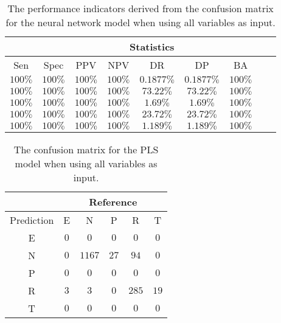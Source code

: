 \begin{table}[!ht]
	\centering
	\begin{tabular}{|c|c|c|c|c|c|c|c|c|}
		\hline
		 & \multicolumn{7}{c|}{Statistics} \\ \hline
		Sen & Spec & PPV & NPV & DR & DP & BA \\ \hline
		$100\%$ & $100\%$ & $100\%$ & $100\%$ & $0.1877\%$ & $0.1877\%$ & $100\%$ \\ \hline
		$100\%$ & $100\%$ & $100\%$ & $100\%$ & $73.22\%$ & $73.22\%$ & $100\%$ \\ \hline
		$100\%$ & $100\%$ & $100\%$ & $100\%$ & $1.69\%$ & $1.69\%$ & $100\%$ \\ \hline
		$100\%$ & $100\%$ & $100\%$ & $100\%$ & $23.72\%$ & $23.72\%$ & $100\%$ \\ \hline
		$100\%$ & $100\%$ & $100\%$ & $100\%$ & $1.189\%$ & $1.189\%$ & $100\%$ \\ \hline
	\end{tabular}
	\caption{The performance indicators derived from the confusion matrix for the neural network model when using all variables as input.}
	\label{tab:cs:all:nnet}
\end{table}

\begin{table}[!ht]
	\centering
	\begin{tabular}{|c|c|c|c|c|c|}
		\hline
		 & \multicolumn{5}{|c|}{Reference} \\ \hline
		 Prediction & E & N & P & R & T \\ \hline
		 E & $0$ & $0$ & $0$ & $0$ & $0$ \\ \hline
		 N & $0$ & $1167$ & $27$ & $94$ & $0$ \\ \hline
		 P & $0$ & $0$ & $0$ & $0$ & $0$ \\ \hline
		 R & $3$ & $3$ & $0$ & $285$ & $19$ \\ \hline
		 T & $0$ & $0$ & $0$ & $0$ & $0$ \\ \hline
	\end{tabular}
	\caption{The confusion matrix for the PLS model when using all variables as input.}
	\label{tab:cm:all:pls}
\end{table}


